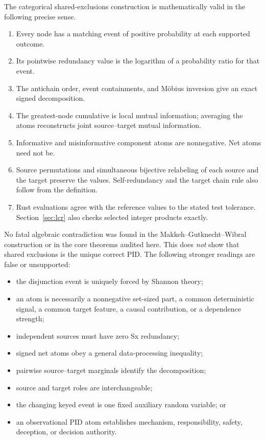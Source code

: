 \documentclass[11pt]{article}
\begin{document}
The categorical shared-exclusions construction is mathematically valid in the
following precise sense.
\begin{enumerate}
  \item Every node has a matching event of positive probability at each supported outcome.
  \item Its pointwise redundancy value is the logarithm of a probability ratio for that event.
  \item The antichain order, event containments, and M\"obius inversion give
        an exact signed decomposition.
  \item The greatest-node cumulative is local mutual information; averaging
        the atoms reconstructs joint source--target mutual information.
  \item Informative and misinformative component atoms are nonnegative.  Net
        atoms need not be.
  \item Source permutations and simultaneous bijective relabeling of each source
        and the target preserve the values. Self-redundancy and the target
        chain rule also follow from the definition.
  \item Rust evaluations agree with the reference values to the stated test tolerance. Section~\ref{sec:lcr} also checks selected integer products exactly.
\end{enumerate}

No fatal algebraic contradiction was found in the Makkeh--Gutknecht--Wibral
construction or in the core theorems audited here.  This does \emph{not} show
that shared exclusions is the unique correct PID\@.  The following stronger
readings are false or unsupported:
\begin{itemize}
  \item the disjunction event is uniquely forced by Shannon theory;
  \item an atom is necessarily a nonnegative set-sized part, a common
        deterministic signal, a common target feature, a causal contribution,
        or a dependence strength;
  \item independent sources must have zero Sx redundancy;
  \item signed net atoms obey a general data-processing inequality;
  \item pairwise source--target marginals identify the decomposition;
  \item source and target roles are interchangeable;
  \item the changing keyed event is one fixed auxiliary random variable; or
  \item an observational PID atom establishes mechanism, responsibility,
        safety, deception, or decision authority.
\end{itemize}
\end{document}
